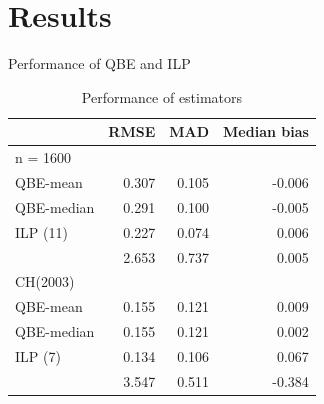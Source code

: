 \documentclass{beamer}
\begin{document}
\section{Results}
\begin{frame}{Performance of QBE and ILP}
    \begin{table}
        \centering
        \begin{tabular}{lrrr}
          \hline
                     & RMSE   & MAD  & Median bias \\ \hline
          n = 1600   &       &       &  \\
          QBE-mean   & 0.307 & 0.105 & -0.006     \\
          QBE-median & 0.291 & 0.100 & -0.005    \\
          ILP (11)   & 0.227 & 0.074 &  0.006    \\
                     & 2.653 & 0.737 &  0.005    \\
          \hline
          CH(2003)   &       &       &  \\
          QBE-mean   & 0.155 & 0.121 &  0.009    \\
          QBE-median & 0.155 & 0.121 &  0.002    \\
          ILP (7)    & 0.134 & 0.106 &  0.067    \\
                     & 3.547 & 0.511 & -0.384    \\
          \hline
        \end{tabular}
        \caption{Performance of estimators}
    \end{table}
\end{frame}
\end{document}
